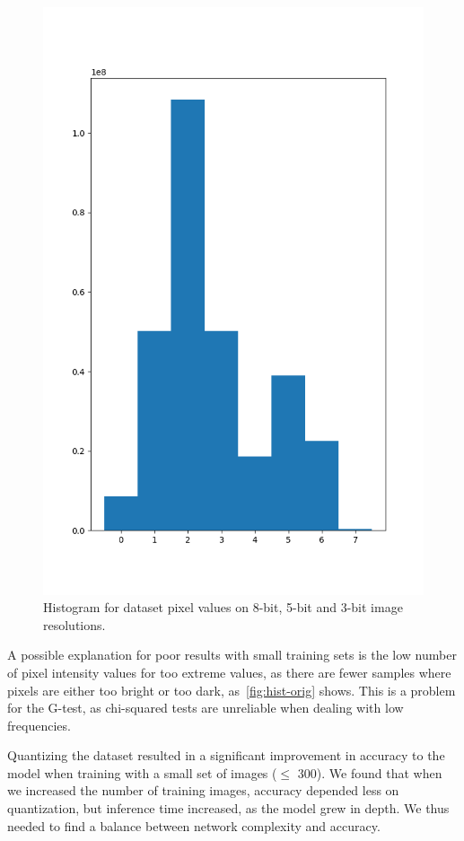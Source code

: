 \begin{figure}[h]
  \includegraphics[scale=0.3]{imgs/hist_3.png}
  \caption{Histogram for dataset pixel values on 8-bit, 5-bit and 3-bit image
    resolutions.\label{fig:hist-orig}}
\end{figure}

A possible explanation for poor results with small training sets is the low number of pixel
intensity values for too extreme values, as there are fewer samples where pixels are either too
bright or too dark, as~\autoref{fig:hist-orig} shows. This is a problem for the G-test, as
chi-squared tests are unreliable when dealing with low frequencies.

Quantizing the dataset resulted in a significant improvement in accuracy to the model when training
with a small set of images ($\leq$ 300). We found that when we increased the number of training
images, accuracy depended less on quantization, but inference time increased, as the model grew in
depth. We thus needed to find a balance between network complexity and accuracy.

